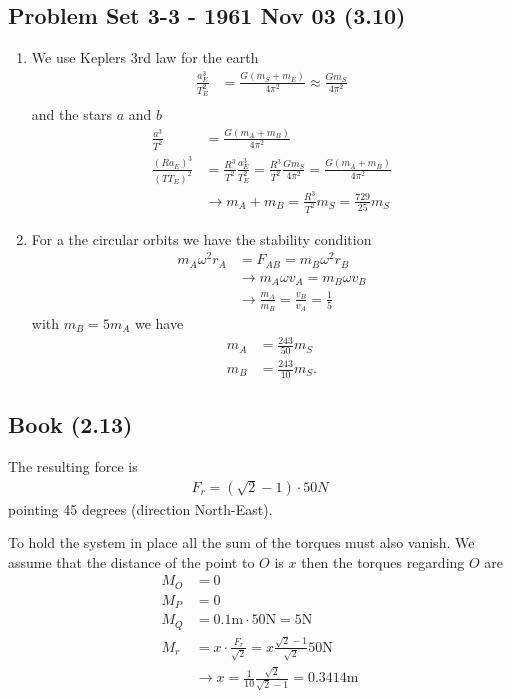 \documentclass[../main.tex]{subfiles}
\begin{document}
\subsection{Problem Set 3-3 - 1961 Nov 03 (3.10)}
\begin{enumerate}[label=(\alph*)]
\item We use Keplers 3rd law for the earth
\begin{align}
    \frac{a_E^3}{T_E^2}&=\frac{G(m_S+m_E)}{4\pi^2}\approx\frac{Gm_S}{4\pi^2}\\
\end{align}
and the stars $a$ and $b$
\begin{align}
    \frac{a^3}{T^2}&=\frac{G(m_A+m_B)}{4\pi^2}\\
    \frac{(Ra_E)^3}{(TT_E)^2}&=\frac{R^3}{T^2}\frac{a_E^3}{T_E^2}=\frac{R^3}{T^2}\frac{Gm_S}{4\pi^2}=\frac{G(m_A+m_B)}{4\pi^2}\\
    &\rightarrow m_A+m_B = \frac{R^3}{T^2}m_S=\frac{729}{25}m_S
\end{align}

\item For a the circular orbits we have the stability condition
\begin{align}
    m_A\omega^2r_A&=F_{AB}=m_B\omega^2r_B\\
    &\rightarrow m_A\omega v_A=m_B\omega v_B\\
    &\rightarrow \frac{m_A}{m_B} =\frac{v_B}{v_A}=\frac{1}{5}
\end{align}
with $m_B=5m_A$ we have 
\begin{align}
    m_A&=\frac{243}{50}m_S\\
    m_B&=\frac{243}{10}m_S.
\end{align}
\end{enumerate}

\subsection{Book (2.13)}
The resulting force is
\begin{align}
F_r=(\sqrt{2}-1)\cdot 50N
\end{align}
pointing 45 degrees (direction North-East).

To hold the system in place all the sum of the torques must also vanish. We assume that the distance of the point to $O$ is $x$ then the torques regarding $O$ are
\begin{align}
M_O&=0\\
M_P&=0\\
M_Q&=0.1\text{m}\cdot50\text{N}=5\text{N}\\
M_r&=x\cdot\frac{F_r}{\sqrt{2}}=x\frac{\sqrt{2}-1}{\sqrt{2}}50\text{N}\\
&\rightarrow x=\frac{1}{10}\frac{\sqrt{2}}{\sqrt{2}-1}=0.3414\text{m}
\end{align}
\end{document}
